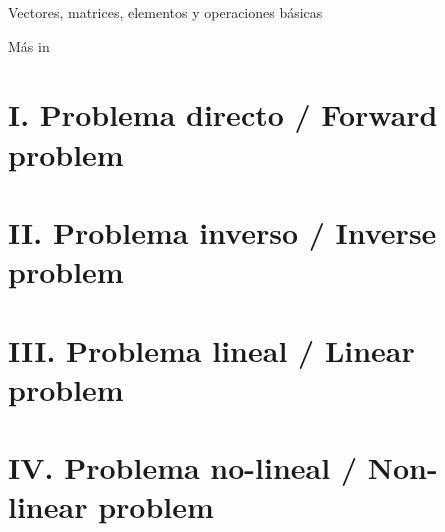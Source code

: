 \documentclass[aspectratio=169]{beamer}
\begin{document}
\begin{frame}
 {Vectores, matrices, elementos y operaciones b\'asicas}

 \begin{center}
  \Large M\'as in \cite{Menke_2018_GEO}
 \end{center}
 
\end{frame}

\section{\small I. Problema directo / Forward problem}

\section{\small II. Problema inverso / Inverse problem}

\section{\small III. Problema lineal / Linear problem}

\section{\small IV. Problema no-lineal / Non-linear problem}

\begin{frame}

    
        

\end{frame}
\end{document}
